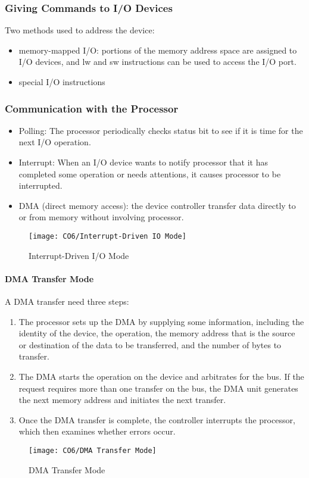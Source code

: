\subsubsection{Giving Commands to I/O Devices}
Two methods used to address the device:
\begin{itemize}\small 
    \item memory-mapped I/O: portions of the memory address space are assigned to I/O devices, and lw and sw instructions can be used to access the I/O port.
    \item special I/O instructions
\end{itemize}

\subsubsection{Communication with the Processor}
\begin{itemize}\small
    \item Polling: The processor periodically checks status bit to see if it is time for the next I/O operation.
    \item Interrupt: When an I/O device wants to notify processor that it has completed some operation or needs attentions, it causes processor to be interrupted.
    \item DMA (direct memory access): the device controller transfer data directly to or from memory without involving processor. 
\end{itemize}

\begin{figure}[!htb]
    \centering
    \texttt{[image: CO6/Interrupt-Driven IO Mode]}
    \caption{Interrupt-Driven I/O Mode}
\end{figure}

\paragraph{DMA Transfer Mode}\quad
A DMA transfer need three steps:
\begin{enumerate}\small 
    \item The processor sets up the DMA by supplying some information, including the identity of the device, the operation, the memory address that is the source or destination of the data to be transferred, and the number of bytes to transfer.
    \item The DMA starts the operation on the device and arbitrates for the bus. If the request requires more than one transfer on the bus, the DMA unit generates the next memory address and initiates the next transfer.
    \item Once the DMA transfer is complete, the controller interrupts the processor, which then examines whether errors occur. 
\end{enumerate}
\begin{figure}[!htb]
    \centering
    \texttt{[image: CO6/DMA Transfer Mode]}
    \caption{DMA Transfer Mode}
\end{figure}


